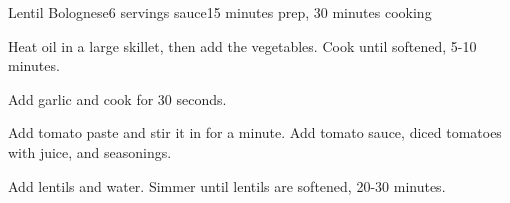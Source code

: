 \documentclass[../Cookbook.tex]{subfiles}
\begin{document}
\begin{recipe}{Lentil Bolognese}{6 servings sauce}{15 minutes prep, 30 minutes cooking}

Heat oil in a large skillet, then add the vegetables. Cook until softened, 5-10 minutes.

Add garlic and cook for 30 seconds.

Add tomato paste and stir it in for a minute. Add tomato sauce, diced tomatoes with juice, and seasonings.

Add lentils and water. Simmer until lentils are softened, 20-30 minutes.

\end{recipe}
\end{document}
